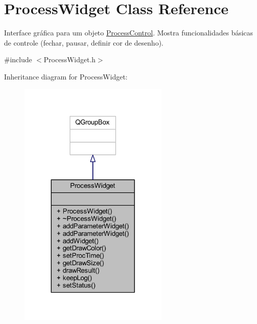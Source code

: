 \hypertarget{class_process_widget}{}\section{Process\+Widget Class Reference}
\label{class_process_widget}


Interface gráfica para um objeto \hyperlink{class_process_control}{Process\+Control}. Mostra funcionalidades básicas de controle (fechar, pausar, definir cor de desenho).  




{\ttfamily \#include $<$Process\+Widget.\+h$>$}



Inheritance diagram for Process\+Widget\+:
\nopagebreak
\begin{figure}[H]
\begin{center}
\leavevmode
\includegraphics[width=203pt]{class_process_widget__inherit__graph}
\end{center}
\end{figure}


